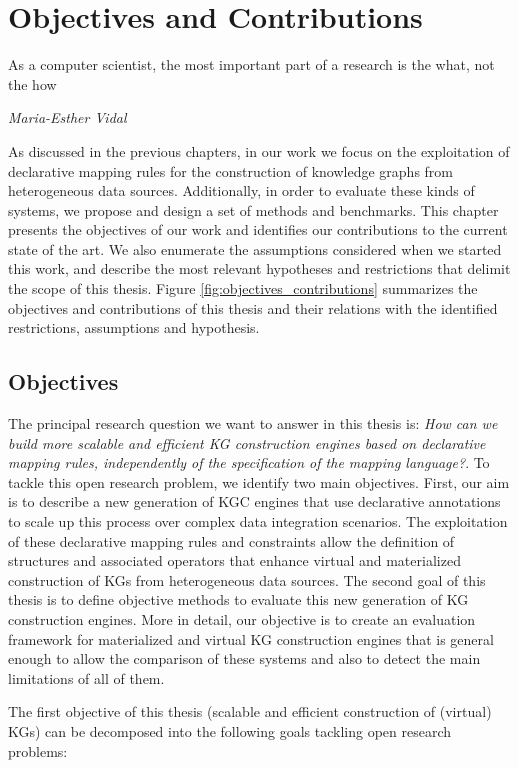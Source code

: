 \chapter{Objectives and Contributions}

\epigraph{As a computer scientist, the most important part of a research is the what, not the how}{\textit{Maria-Esther Vidal}}

\label{chap:objectives}
As discussed in the previous chapters, in our work we focus on the exploitation of declarative mapping rules for the construction of knowledge graphs from heterogeneous data sources. Additionally, in order to evaluate these kinds of systems, we propose and design a set of methods and benchmarks. This chapter presents the objectives of our work and identifies our contributions to the current state of the art. We also enumerate the assumptions considered when we started this work, and describe the most relevant hypotheses and restrictions that delimit the scope of this thesis. Figure \ref{fig:objectives_contributions} summarizes the objectives and contributions of this thesis and their relations with the identified restrictions, assumptions and hypothesis.

\section{Objectives}
The principal research question we want to answer in this thesis is: \textit{How can we build more scalable and efficient KG construction engines based on declarative mapping rules, independently of the specification of the mapping language?}. To tackle this open research problem, we identify two main objectives. 
First, our aim is to describe a new generation of KGC engines that use declarative annotations to scale up this process over complex data integration scenarios. The exploitation of these declarative mapping rules and constraints allow the definition of structures and associated operators that enhance virtual and materialized construction of KGs from heterogeneous data sources. The second goal of this thesis is to define objective methods to evaluate this new generation of KG construction engines. More in detail, our objective is to create an evaluation framework for materialized and virtual KG construction engines that is general enough to allow the comparison of these systems and also to detect the main limitations of all of them.

The first objective of this thesis (scalable and efficient construction of (virtual) KGs) can be decomposed into the following goals tackling open research problems:


